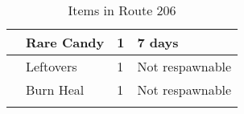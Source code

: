 \begin{longtable}{|| l l l l ||}%
\hline%
&Rare Candy&1&7 days\\%
\hline%
&Leftovers&1&Not respawnable\\%
\hline%
&Burn Heal&1&Not respawnable\\%
\hline%
\endhead%
\hline%
\caption{Items in Route 206}%
\label{tab:Route206Items}%
\end{longtable}